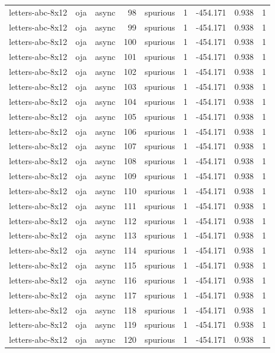 \begin{tabular}{lllrlrrrr}
letters-abc-8x12 & oja & async & 98 & spurious & 1 & -454.171 & 0.938 & 1 \\
letters-abc-8x12 & oja & async & 99 & spurious & 1 & -454.171 & 0.938 & 1 \\
letters-abc-8x12 & oja & async & 100 & spurious & 1 & -454.171 & 0.938 & 1 \\
letters-abc-8x12 & oja & async & 101 & spurious & 1 & -454.171 & 0.938 & 1 \\
letters-abc-8x12 & oja & async & 102 & spurious & 1 & -454.171 & 0.938 & 1 \\
letters-abc-8x12 & oja & async & 103 & spurious & 1 & -454.171 & 0.938 & 1 \\
letters-abc-8x12 & oja & async & 104 & spurious & 1 & -454.171 & 0.938 & 1 \\
letters-abc-8x12 & oja & async & 105 & spurious & 1 & -454.171 & 0.938 & 1 \\
letters-abc-8x12 & oja & async & 106 & spurious & 1 & -454.171 & 0.938 & 1 \\
letters-abc-8x12 & oja & async & 107 & spurious & 1 & -454.171 & 0.938 & 1 \\
letters-abc-8x12 & oja & async & 108 & spurious & 1 & -454.171 & 0.938 & 1 \\
letters-abc-8x12 & oja & async & 109 & spurious & 1 & -454.171 & 0.938 & 1 \\
letters-abc-8x12 & oja & async & 110 & spurious & 1 & -454.171 & 0.938 & 1 \\
letters-abc-8x12 & oja & async & 111 & spurious & 1 & -454.171 & 0.938 & 1 \\
letters-abc-8x12 & oja & async & 112 & spurious & 1 & -454.171 & 0.938 & 1 \\
letters-abc-8x12 & oja & async & 113 & spurious & 1 & -454.171 & 0.938 & 1 \\
letters-abc-8x12 & oja & async & 114 & spurious & 1 & -454.171 & 0.938 & 1 \\
letters-abc-8x12 & oja & async & 115 & spurious & 1 & -454.171 & 0.938 & 1 \\
letters-abc-8x12 & oja & async & 116 & spurious & 1 & -454.171 & 0.938 & 1 \\
letters-abc-8x12 & oja & async & 117 & spurious & 1 & -454.171 & 0.938 & 1 \\
letters-abc-8x12 & oja & async & 118 & spurious & 1 & -454.171 & 0.938 & 1 \\
letters-abc-8x12 & oja & async & 119 & spurious & 1 & -454.171 & 0.938 & 1 \\
letters-abc-8x12 & oja & async & 120 & spurious & 1 & -454.171 & 0.938 & 1 \\

\end{tabular}
